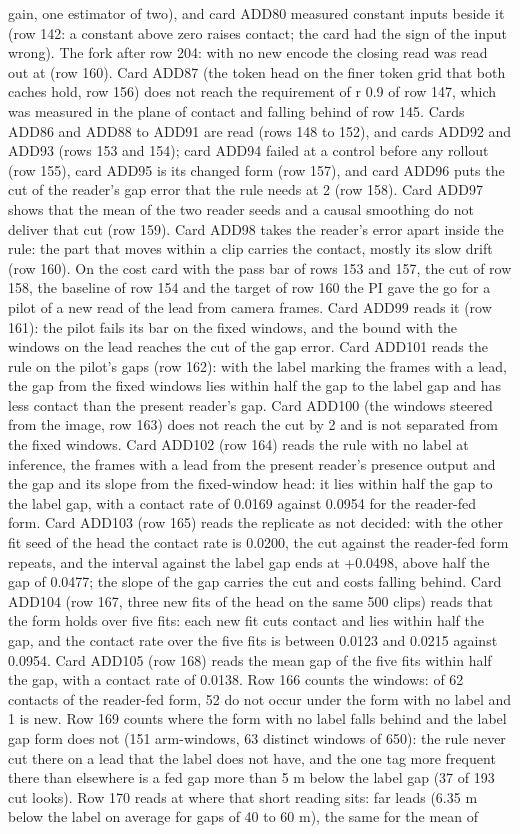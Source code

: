 gain, one estimator of two), and card ADD80 measured constant inputs beside it (row 142: a constant above zero raises contact; the card had the sign of the input wrong). The fork after row 204: with no new encode the closing read was read out at  (row 160). Card ADD87 (the token head on the finer token grid that both caches hold, row 156) does not reach the requirement of r 0.9 of row 147, which was measured in the plane of contact and falling behind of row 145. Cards ADD86 and ADD88 to ADD91 are read (rows 148 to 152), and cards ADD92 and ADD93 (rows 153 and 154); card ADD94 failed at a control before any rollout (row 155), card ADD95 is its changed form (row 157), and card ADD96 puts the cut of the reader's gap error that the rule needs at 2 (row 158). Card ADD97 shows that the mean of the two reader seeds and a causal smoothing do not deliver that cut (row 159). Card ADD98 takes the reader's error apart inside the rule: the part that moves within a clip carries the contact, mostly its slow drift (row 160). On the cost card with the pass bar of rows 153 and 157, the cut of row 158, the baseline of row 154 and the target of row 160 the PI gave the go for a pilot of a new read of the lead from camera frames. Card ADD99 reads it (row 161): the pilot fails its bar on the fixed windows, and the bound with the windows on the lead reaches the cut of the gap error. Card ADD101 reads the rule on the pilot's gaps (row 162): with the label marking the frames with a lead, the gap from the fixed windows lies within half the gap to the label gap and has less contact than the present reader's gap. Card ADD100 (the windows steered from the image, row 163) does not reach the cut by 2 and is not separated from the fixed windows. Card ADD102 (row 164) reads the rule with no label at inference, the frames with a lead from the present reader's presence output and the gap and its slope from the fixed-window head: it lies within half the gap to the label gap, with a contact rate of 0.0169 against 0.0954 for the reader-fed form. Card ADD103 (row 165) reads the replicate as not decided: with the other fit seed of the head the contact rate is 0.0200, the cut against the reader-fed form repeats, and the interval against the label gap ends at +0.0498, above half the gap of 0.0477; the slope of the gap carries the cut and costs falling behind. Card ADD104 (row 167, three new fits of the head on the same 500 clips) reads that the form holds over five fits: each new fit cuts contact and lies within half the gap, and the contact rate over the five fits is between 0.0123 and 0.0215 against 0.0954. Card ADD105 (row 168) reads the mean gap of the five fits within half the gap, with a contact rate of 0.0138. Row 166 counts the windows: of 62 contacts of the reader-fed form, 52 do not occur under the form with no label and 1 is new. Row 169 counts where the form with no label falls behind and the label gap form does not (151 arm-windows, 63 distinct windows of 650): the rule never cut there on a lead that the label does not have, and the one tag more frequent there than elsewhere is a fed gap more than 5 m below the label gap (37 of 193 cut looks). Row 170 reads at  where that short reading sits: far leads (6.35 m below the label on average for gaps of 40 to 60 m), the same for the mean of 